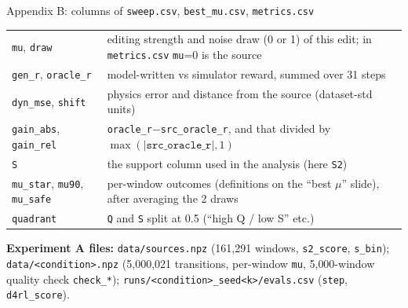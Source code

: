 \documentclass[aspectratio=169,11pt]{beamer}
\begin{document}
\begin{frame}{Appendix B: columns of \texttt{sweep.csv}, \texttt{best\_mu.csv}, \texttt{metrics.csv}}
\footnotesize
\begin{tabularx}{\linewidth}{lY}
\toprule
\texttt{mu}, \texttt{draw} & editing strength and noise draw (0 or 1) of this edit; in \texttt{metrics.csv} \texttt{mu}=0 is the source\\
\texttt{gen\_r}, \texttt{oracle\_r} & model-written vs simulator reward, summed over 31 steps\\
\texttt{dyn\_mse}, \texttt{shift} & physics error and distance from the source (dataset-std units)\\
\texttt{gain\_abs}, \texttt{gain\_rel} & \texttt{oracle\_r}$-$\texttt{src\_oracle\_r}, and that divided by $\max(|\texttt{src\_oracle\_r}|,1)$\\
\texttt{S} & the support column used in the analysis (here \texttt{S2})\\
\texttt{mu\_star}, \texttt{mu90}, \texttt{mu\_safe} & per-window outcomes (definitions on the ``best $\mu$'' slide), after averaging the 2 draws\\
\texttt{quadrant} & \texttt{Q} and \texttt{S} split at 0.5 (``high Q / low S'' etc.)\\
\bottomrule
\end{tabularx}
\vspace{0.5em}

\textbf{Experiment A files:} \texttt{data/sources.npz} (161{,}291 windows, \texttt{s2\_score}, \texttt{s\_bin}); \texttt{data/<condition>.npz} (5{,}000{,}021 transitions, per-window \texttt{mu}, 5{,}000-window quality check \texttt{check\_*}); \texttt{runs/<condition>\_seed<k>/evals.csv} (\texttt{step}, \texttt{d4rl\_score}).
\end{frame}
\end{document}
